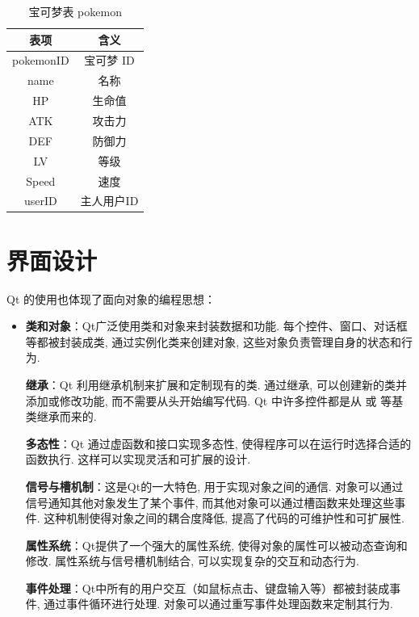 \begin{longtable}[c]{|c|c|}
    \caption{宝可梦表 pokemon}    \\
    \hline
    \textbf{表项} & \textbf{含义} \\ \hline
    \endfirsthead
    \endhead
    pokemonID   & 宝可梦 ID      \\ \hline
    name        & 名称          \\ \hline
    HP          & 生命值         \\ \hline
    ATK         & 攻击力         \\ \hline
    DEF         & 防御力         \\ \hline
    LV          & 等级          \\ \hline
    Speed       & 速度          \\ \hline
    userID      & 主人用户ID      \\ \hline
\end{longtable}

\section{界面设计}

Qt 的使用也体现了面向对象的编程思想：\begin{itemize}
    \item \textbf{类和对象}：Qt广泛使用类和对象来封装数据和功能. 每个控件、窗口、对话框等都被封装成类, 通过实例化类来创建对象, 这些对象负责管理自身的状态和行为.

          \textbf{继承}：Qt 利用继承机制来扩展和定制现有的类. 通过继承, 可以创建新的类并添加或修改功能, 而不需要从头开始编写代码. Qt 中许多控件都是从  或  等基类继承而来的.

          \textbf{多态性}：Qt 通过虚函数和接口实现多态性, 使得程序可以在运行时选择合适的函数执行. 这样可以实现灵活和可扩展的设计.

          \textbf{信号与槽机制}：这是Qt的一大特色, 用于实现对象之间的通信. 对象可以通过信号通知其他对象发生了某个事件, 而其他对象可以通过槽函数来处理这些事件. 这种机制使得对象之间的耦合度降低, 提高了代码的可维护性和可扩展性.

          \textbf{属性系统}：Qt提供了一个强大的属性系统, 使得对象的属性可以被动态查询和修改. 属性系统与信号槽机制结合, 可以实现复杂的交互和动态行为.

          \textbf{事件处理}：Qt中所有的用户交互（如鼠标点击、键盘输入等）都被封装成事件, 通过事件循环进行处理. 对象可以通过重写事件处理函数来定制其行为.
\end{itemize}

